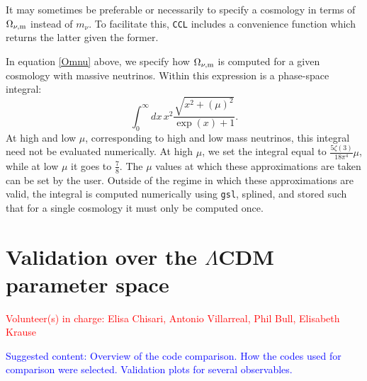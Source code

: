 \documentclass[\docopts]{\docclass}
\newcommand{\vol}[1]{\textcolor{red}{Volunteer(s) in charge: #1}}
\newcommand{\cont}[1]{\textcolor{blue}{Suggested content: #1}}
\newcommand{\ccl}{{\tt CCL}\xspace}
\begin{document}
It may sometimes be preferable or necessarily to specify a cosmology in terms of $\Omega_{\nu, {\rm m}}$ instead of $m_\nu$. To facilitate this, \ccl includes a convenience function which returns the latter given the former.

In equation \ref{Omnu} above, we specify how $\Omega_{\nu, {\rm m}}$ is computed for a given cosmology with massive neutrinos. Within this expression is a phase-space integral:
\begin{equation}
\int_0^{\infty} dx \, x^2 \frac{\sqrt{x^2 + \left(\mu\right)^2}}{\exp(x) + 1}.
\label{phasespacenu}
\end{equation}
At high and low $\mu$, corresponding to high and low mass neutrinos, this integral need not be evaluated numerically. At high $\mu$, we set the integral equal to $\frac{5\zeta(3)}{18\pi^4}\mu$, while at low $\mu$ it goes to $\frac{7}{8}$. The $\mu$ values at which these approximations are taken can be set by the user. Outside of the regime in which these approximations are valid, the integral is computed numerically using {\tt gsl}, splined, and stored such that for a single cosmology it must only be computed once.


\section{Validation over the $\Lambda$CDM parameter space}
\label{sec:validation}



\vol{Elisa Chisari, Antonio Villarreal, Phil Bull, Elisabeth Krause}

\cont{Overview of the code comparison. How the codes used for comparison were selected. Validation plots for several observables.}
\end{document}
